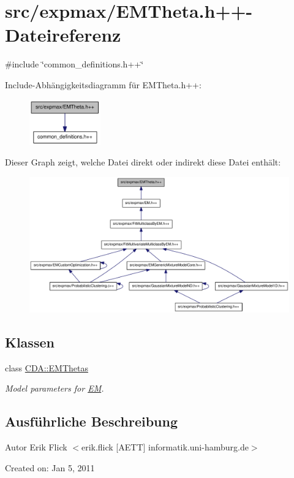\hypertarget{EMTheta_8h_09_09}{
\section{src/expmax/EMTheta.h++-\/Dateireferenz}
\label{EMTheta_8h_09_09}
}
{\ttfamily \#include \char`\"{}common\_\-definitions.h++\char`\"{}}\par
Include-\/Abhängigkeitsdiagramm für EMTheta.h++:\nopagebreak
\begin{figure}[H]
\begin{center}
\leavevmode
\includegraphics[width=87pt]{EMTheta_8h_09_09__incl}
\end{center}
\end{figure}
Dieser Graph zeigt, welche Datei direkt oder indirekt diese Datei enthält:\nopagebreak
\begin{figure}[H]
\begin{center}
\leavevmode
\includegraphics[width=380pt]{EMTheta_8h_09_09__dep__incl}
\end{center}
\end{figure}
\subsection*{Klassen}
\begin{DoxyCompactItemize}
\item 
class \hyperlink{classCDA_1_1EMThetas}{CDA::EMThetas}
\begin{DoxyCompactList}\small\item\em Model parameters for \hyperlink{classCDA_1_1EM}{EM}. \item\end{DoxyCompactList}\end{DoxyCompactItemize}


\subsection{Ausführliche Beschreibung}
\begin{DoxyAuthor}{Autor}
Erik Flick $<$erik.flick \mbox{[}AETT\mbox{]} informatik.uni-\/hamburg.de$>$
\end{DoxyAuthor}
Created on: Jan 5, 2011 